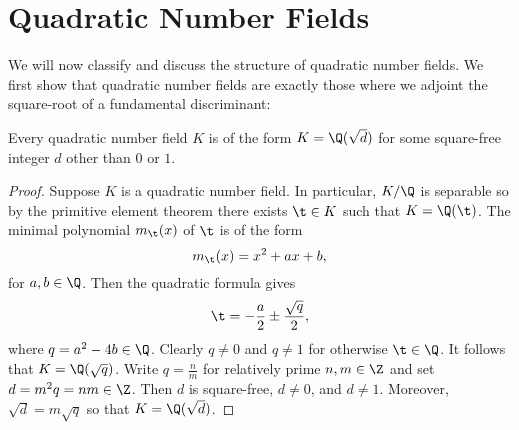   \section{}
  \section{Quadratic Number Fields}
    We will now classify and discuss the structure of quadratic number fields. We first show that quadratic number fields are exactly those where we adjoint the square-root of a fundamental discriminant:

    \begin{proposition}\label{prop:classification_of_quadratic_number_fields}
      Every quadratic number field $K$ is of the form $K = \Q(\sqrt{d})$ for some square-free integer $d$ other than $0$ or $1$.
    \end{proposition}
    \begin{proof}
      Suppose $K$ is a quadratic number field. In particular, $K/\Q$ is separable so by the primitive element theorem there exists $\t \in K$ such that $K = \Q(\t)$. The minimal polynomial $m_{\t}(x)$ of $\t$ is of the form
      \[
        m_{\t}(x) = x^{2}+ax+b,
      \]
      for $a,b \in \Q$. Then the quadratic formula gives
      \[
        \t = -\frac{a}{2}\pm\frac{\sqrt{q}}{2},
      \]
      where $q = a^{2}-4b \in \Q$. Clearly $q \neq 0$ and $q \neq 1$ for otherwise $\t \in \Q$. It follows that $K = \Q(\sqrt{q})$. Write $q = \frac{n}{m}$ for relatively prime $n,m \in \Z$ and set $d = m^{2}q = nm \in \Z$. Then $d$ is square-free, $d \neq 0$, and $d \neq 1$. Moreover, $\sqrt{d} = m\sqrt{q}$ so that $K = \Q(\sqrt{d})$. 
    \end{proof}

